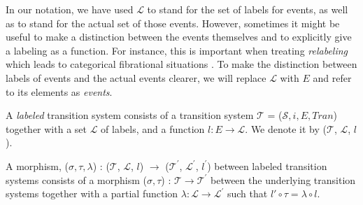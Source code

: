    In our notation, we have used $\mathcal{L}$ to stand for the set of labels for events, as well as to stand for the actual set of those events. However, sometimes it might be useful to make a distinction between the events themselves and to explicitly give a labeling as a function. For instance, this is important when treating \emph{relabeling} which leads to categorical fibrational situations \cite{winskel95modelsCategory}. To make the distinction between labels of events and the actual events clearer, we will replace $\mathcal{L}$ with $E$ and refer to its elements as \emph{events}.
    
    \begin{definition}\label{def:labeled-transition-system}
        A \emph{labeled} transition system consists of a transition system $\mathcal{T}$ = ($\mathcal{S}, i, E, Tran$) together with a set $\mathcal{L}$ of labels, and a function $l: E \rightarrow \mathcal{L}$. We denote it by ($\mathcal{T}$, $\mathcal{L}$, $l$).
    \end{definition}
    
    \begin{definition}\label{def:morphisms-labeled-transition-system}
        A morphism, ($\sigma,\tau, \lambda$) : ($\mathcal{T}$, $\mathcal{L}$, $l$) $\rightarrow$ ($\mathcal{T}^{'}$, $\mathcal{L}^{'}$, $l^{'}$) between labeled transition systems consists of a morphism ($\sigma, \tau$) : $\mathcal{T} \rightarrow \mathcal{T}^{'}$ between the underlying transition systems together with a partial function $\lambda : \mathcal{L} \rightarrow \mathcal{L}^{'}$ such that $l' \circ \tau = \lambda \circ l$.
    \end{definition}

    
